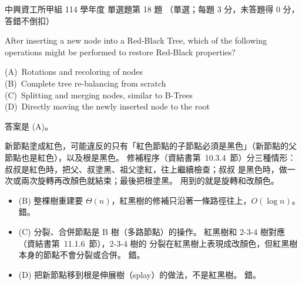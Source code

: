 \begin{pastexam}[label={px:nchu-114-dsa-18}]{中興資工所甲組 114 學年度 單選題第 18 題}
（單選；每題 3 分，未答題得 0 分，答錯不倒扣）

After inserting a new node into a Red-Black Tree, which of the following operations might be performed to restore Red-Black properties?

(A)~Rotations and recoloring of nodes\\
(B)~Complete tree re-balancing from scratch\\
(C)~Splitting and merging nodes, similar to B-Trees\\
(D)~Directly moving the newly inserted node to the root
\end{pastexam}

\begin{pastsoln}
答案是 (A)。

新節點塗成紅色，可能違反的只有「紅色節點的子節點必須是黑色」（新節點的父節點也是紅色），以及根是黑色。
修補程序（資結書第~10.3.4~節）分三種情形：叔叔是紅色時，把父、叔塗黑、祖父塗紅，往上繼續檢查；叔叔
是黑色時，做一次或兩次旋轉再改顏色就結束；最後把根塗黑。 用到的就是旋轉和改顏色。
\begin{itemize}
\item (B) 整棵樹重建要 $\Theta(n)$，紅黑樹的修補只沿著一條路徑往上，$O(\log n)$。 錯。
\item (C) 分裂、合併節點是 B 樹（多路節點）的操作。 紅黑樹和 2-3-4 樹對應（資結書第~11.1.6~節），2-3-4 樹的
分裂在紅黑樹上表現成改顏色，但紅黑樹本身的節點不會分裂或合併。 錯。
\item (D) 把新節點移到根是伸展樹（splay）的做法，不是紅黑樹。 錯。
\end{itemize}
\end{pastsoln}
